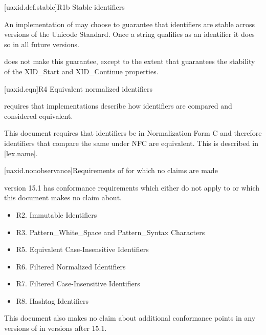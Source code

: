 [uaxid.def.stable]{R1b Stable identifiers}

\pnum
An implementation of  may choose to guarantee
that identifiers are stable across versions of the Unicode Standard.
Once a string qualifies as an identifier it does so in all future versions.

\pnum
\Cpp{} does not make this guarantee,
except to the extent that  guarantees
the stability of the XID_Start and XID_Continue properties.

[uaxid.eqn]{R4 Equivalent normalized identifiers}

\pnum
{} requires that implementations describe
how identifiers are compared and considered equivalent.

\pnum
This document requires that identifiers be in Normalization Form C and
therefore identifiers that compare the same under NFC are equivalent.
This is described in \ref{lex.name}.

[uaxid.nonobservance]{Requirements of  for which no claims are made}

\pnum
   version 15.1 has conformance requirements which either do not apply to \Cpp{} or which this document makes no claim about.
  \begin{itemize}
  \item R2. Immutable Identifiers
  \item R3. Pattern_White_Space and Pattern_Syntax Characters
  \item R5. Equivalent Case-Insensitive Identifiers
  \item R6. Filtered Normalized Identifiers
  \item R7. Filtered Case-Insensitive Identifiers
  \item R8. Hashtag Identifiers
\end{itemize}

\pnum
This document also makes no claim about additional conformance points in any versions of  in versions after 15.1.
